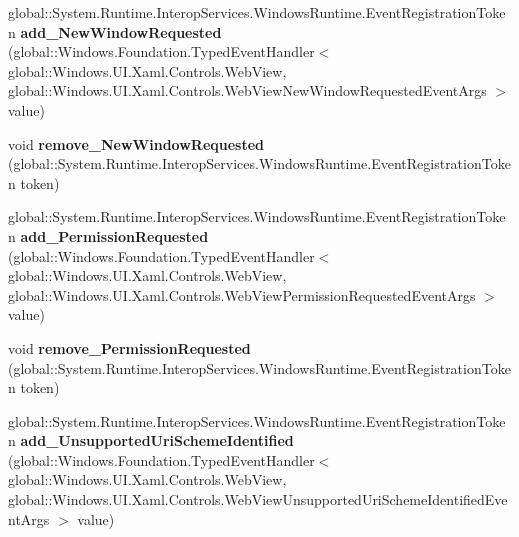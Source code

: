 \begin{DoxyCompactItemize}
global\+::\+System.\+Runtime.\+Interop\+Services.\+Windows\+Runtime.\+Event\+Registration\+Token {\bfseries add\+\_\+\+New\+Window\+Requested} (global\+::\+Windows.\+Foundation.\+Typed\+Event\+Handler$<$ global\+::\+Windows.\+U\+I.\+Xaml.\+Controls.\+Web\+View, global\+::\+Windows.\+U\+I.\+Xaml.\+Controls.\+Web\+View\+New\+Window\+Requested\+Event\+Args $>$ value)
\item 
\mbox{\label{interface_windows_1_1_u_i_1_1_xaml_1_1_controls_1_1_i_web_view4_a06f4976e0ae89feefa9ca60a799e7301}} 
void {\bfseries remove\+\_\+\+New\+Window\+Requested} (global\+::\+System.\+Runtime.\+Interop\+Services.\+Windows\+Runtime.\+Event\+Registration\+Token token)
\item 
\mbox{\label{interface_windows_1_1_u_i_1_1_xaml_1_1_controls_1_1_i_web_view4_adc0957ca3dc33612444167bf57005531}} 
global\+::\+System.\+Runtime.\+Interop\+Services.\+Windows\+Runtime.\+Event\+Registration\+Token {\bfseries add\+\_\+\+Permission\+Requested} (global\+::\+Windows.\+Foundation.\+Typed\+Event\+Handler$<$ global\+::\+Windows.\+U\+I.\+Xaml.\+Controls.\+Web\+View, global\+::\+Windows.\+U\+I.\+Xaml.\+Controls.\+Web\+View\+Permission\+Requested\+Event\+Args $>$ value)
\item 
\mbox{\label{interface_windows_1_1_u_i_1_1_xaml_1_1_controls_1_1_i_web_view4_a991ecf7ea74a7ba6b4e0df9150bd903e}} 
void {\bfseries remove\+\_\+\+Permission\+Requested} (global\+::\+System.\+Runtime.\+Interop\+Services.\+Windows\+Runtime.\+Event\+Registration\+Token token)
\item 
\mbox{\label{interface_windows_1_1_u_i_1_1_xaml_1_1_controls_1_1_i_web_view4_a6e70ca803e5cf51c343058bd94efe3cb}} 
global\+::\+System.\+Runtime.\+Interop\+Services.\+Windows\+Runtime.\+Event\+Registration\+Token {\bfseries add\+\_\+\+Unsupported\+Uri\+Scheme\+Identified} (global\+::\+Windows.\+Foundation.\+Typed\+Event\+Handler$<$ global\+::\+Windows.\+U\+I.\+Xaml.\+Controls.\+Web\+View, global\+::\+Windows.\+U\+I.\+Xaml.\+Controls.\+Web\+View\+Unsupported\+Uri\+Scheme\+Identified\+Event\+Args $>$ value)
\item 
\mbox{\label{interface_windows_1_1_u_i_1_1_xaml_1_1_controls_1_1_i_web_view4_a434db913b569c214fdd8ee1886fb3295}} 

\end{DoxyCompactItemize}
